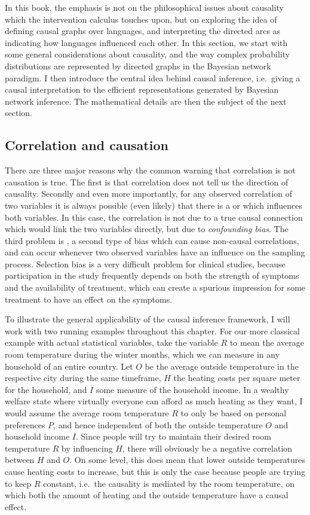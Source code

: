 In this book, the emphasis is not on the philosophical issues about causality which the intervention calculus touches upon, but on exploring the idea of defining causal graphs over languages, and interpreting the directed arcs as indicating how languages influenced each other. In this section, we start with some general considerations about causality, and the way complex probability distributions are represented by directed graphs in the Bayesian network paradigm. I then introduce the central idea behind causal inference, i.e.\ giving a causal interpretation to the efficient representations generated by Bayesian network inference. The mathematical details are then the subject of the next section.

\subsection{Correlation and causation}
There are three major reasons why the common warning that correlation is not causation is true. The first is that correlation does not tell us the direction of causality. Secondly and even more importantly, for any observed correlation of two variables it is always possible (even likely) that there is a \textit{} or \textit{} which influences both variables. In this case, the correlation is not due to a true causal connection which would link the two variables directly, but due to \textit{confounding bias}. The third problem is \textit{}, a second type of bias which can cause non-causal correlations, and can occur whenever two observed variables have an influence on the sampling process. Selection bias is a very difficult problem for clinical studies, because participation in the study frequently depends on both the strength of symptoms and the availability of treatment, which can create a spurious impression for some treatment to have an effect on the symptoms.

To illustrate the general applicability of the causal inference framework, I will work with two running examples throughout this chapter. For our more classical example with actual statistical variables, take the variable $R$ to mean the average room temperature during the winter months, which we can measure in any household of an entire country. Let $O$ be the average outside temperature in the respective city during the same timeframe, $H$ the heating costs per square meter for the household, and $I$ some measure of the household income. In a wealthy welfare state where virtually everyone can afford as much heating as they want, I would assume the average room temperature $R$ to only be based on personal preferences $P$, and hence independent of both the outside temperature $O$ and household income $I$. Since people will try to maintain their desired room temperature $R$ by influencing $H$, there will obviously be a negative correlation between $H$ and $O$. On some level, this does mean that lower outside 
temperatures cause heating costs to increase, but this is only the case because people are trying to keep $R$ constant, i.e.\ the causality is mediated by the room temperature, on which both the amount of heating and the outside temperature have a causal effect.

